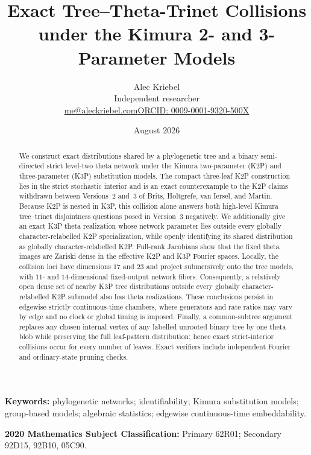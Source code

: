 \documentclass[11pt]{article}
\title{Exact Tree--Theta-Trinet Collisions\\under the Kimura 2- and 3-Parameter Models}
\author{Alec Kriebel\\[-1mm]\small Independent researcher\\[-1mm]\small\href{mailto:me@aleckriebel.com}{me@aleckriebel.com}\quad\textbar\quad\href{https://orcid.org/0009-0001-9320-500X}{ORCID: 0009-0001-9320-500X}}
\date{August 2026}
\theoremstyle{remark}\newtheorem{remark}[theorem]{Remark}
\begin{document}
\maketitle
\begin{abstract}
We construct exact distributions shared by a phylogenetic tree and a binary semi-directed strict level-two theta network under the Kimura two-parameter (K2P) and three-parameter (K3P) substitution models. The compact three-leaf K2P construction lies in the strict stochastic interior and is an exact counterexample to the K2P claims withdrawn between Versions~2 and~3 of Brits, Holtgrefe, van Iersel, and Martin. Because K2P is nested in K3P, this collision alone answers both high-level Kimura tree--trinet disjointness questions posed in Version~3 negatively. We additionally give an exact K3P theta realization whose network parameter lies outside every globally character-relabelled K2P specialization, while openly identifying its shared distribution as globally character-relabelled K2P. Full-rank Jacobians show that the fixed theta images are Zariski dense in the effective K2P and K3P Fourier spaces. Locally, the collision loci have dimensions $17$ and $23$ and project submersively onto the tree models, with $11$- and $14$-dimensional fixed-output network fibers. Consequently, a relatively open dense set of nearby K3P tree distributions outside every globally character-relabelled K2P submodel also has theta realizations. These conclusions persist in edgewise strictly continuous-time chambers, where generators and rate ratios may vary by edge and no clock or global timing is imposed. Finally, a common-subtree argument replaces any chosen internal vertex of any labelled unrooted binary tree by one theta blob while preserving the full leaf-pattern distribution; hence exact strict-interior collisions occur for every number of leaves. Exact verifiers include independent Fourier and ordinary-state pruning checks.
\end{abstract}
\noindent\textbf{Keywords:} phylogenetic networks; identifiability; Kimura substitution models; group-based models; algebraic statistics; edgewise continuous-time embeddability.

\medskip
\noindent\textbf{2020 Mathematics Subject Classification:} Primary 62R01; Secondary 92D15, 92B10, 05C90.
\end{document}

